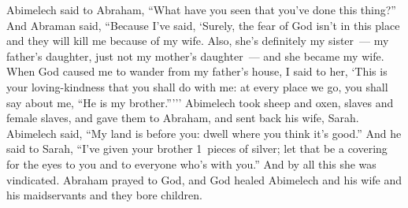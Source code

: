 \begin{inparaenum}
     Abimelech said to Abraham, ``What have you seen that you've done this thing?''%
     And Abraman said, ``Because I've said, `Surely, the fear of God isn't in this place and they will kill me because of my wife.%
     Also, she's definitely my sister~--- my father's daughter, just not my mother's daughter~--- and she became my wife.%
     When God caused me to wander from my father's house, I said to her, `This is your loving-kindness that you shall do with me: at every place we go, you shall say about me, ``He is my brother.''\thinspace'\thinspace''%
     Abimelech took sheep and oxen, slaves and female slaves, and gave them to Abraham, and sent back his wife, Sarah.%
     Abimelech said, ``My land is before you: dwell where you think it's good.''%
     And he said to Sarah, ``I've given your brother 1~pieces of silver; let that be a covering for the eyes to you and to everyone who's with you.'' And by all this she was vindicated.%
     Abraham prayed to God, and God healed Abimelech and his wife and his maidservants and they bore children.\understood%
\end{inparaenum}
